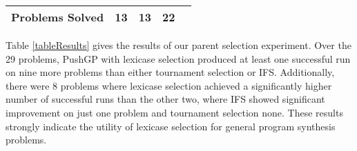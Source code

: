 \documentclass{sig-alternate}
\begin{document}
\begin{table}[t]
\begin{tabular}{lrrr|r}
\midrule
\rowcolor{white} Problems Solved          & 13       & 13      & 22 &   \\
\bottomrule
\end{tabular}
\end{table}


Table \ref{tableResults} gives the results of our parent selection experiment. Over the 29 problems, PushGP with lexicase selection produced at least one successful run on nine more problems than either tournament selection or IFS.
Additionally, there were 8 problems where lexicase selection achieved a significantly higher number of successful runs than the other two, where IFS showed significant improvement on just one problem and tournament selection none. These results strongly indicate the utility of lexicase selection for general program synthesis problems.
\end{document}
